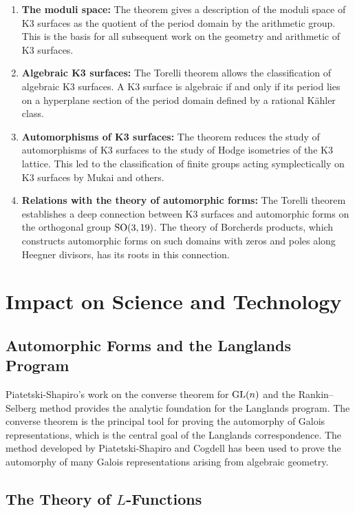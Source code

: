 \begin{enumerate}
    \item \textbf{The moduli space:} The theorem gives a description of the moduli space of K3 surfaces as the quotient of the period domain by the arithmetic group. This is the basis for all subsequent work on the geometry and arithmetic of K3 surfaces.

    \item \textbf{Algebraic K3 surfaces:} The Torelli theorem allows the classification of algebraic K3 surfaces. A K3 surface is algebraic if and only if its period lies on a hyperplane section of the period domain defined by a rational K\"{a}hler class.

    \item \textbf{Automorphisms of K3 surfaces:} The theorem reduces the study of automorphisms of K3 surfaces to the study of Hodge isometries of the K3 lattice. This led to the classification of finite groups acting symplectically on K3 surfaces by Mukai and others.

    \item \textbf{Relations with the theory of automorphic forms:} The Torelli theorem establishes a deep connection between K3 surfaces and automorphic forms on the orthogonal group \(\operatorname{SO}(3,19)\). The theory of Borcherds products, which constructs automorphic forms on such domains with zeros and poles along Heegner divisors, has its roots in this connection.
\end{enumerate}

\section{Impact on Science and Technology}

\subsection{Automorphic Forms and the Langlands Program}

Piatetski-Shapiro's work on the converse theorem for \(\operatorname{GL}(n)\) and the Rankin--Selberg method provides the analytic foundation for the Langlands program. The converse theorem is the principal tool for proving the automorphy of Galois representations, which is the central goal of the Langlands correspondence. The method developed by Piatetski-Shapiro and Cogdell has been used to prove the automorphy of many Galois representations arising from algebraic geometry.

\subsection{The Theory of \texorpdfstring{\(L\)}{L}-Functions}

